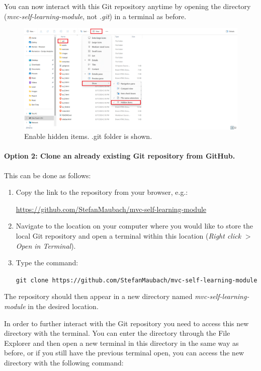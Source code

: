 \documentclass[a4paper,10pt]{article}
\begin{document}
You can now interact with this Git repository anytime by opening the directory (\emph{mvc-self-learning-module}, not \emph{.git}) in a terminal as before.

\begin{figure}[htbp]
    \centering
    \includegraphics[width=\textwidth]{hidden_items.png}
    \caption{Enable hidden items. .git folder is shown.}
    \label{fig:hidden_items}   
\end{figure}

\paragraph{Option 2: Clone an already existing Git repository from GitHub.} This can be done as follows:
\begin{enumerate}
    \item Copy the link to the repository from your browser, e.g.: 

    \url{https://github.com/StefanMaubach/mvc-self-learning-module}
    
    \item Navigate to the location on your computer where you would like to store the local Git repository and open a terminal within this location (\emph{Right click} $>$ \emph{Open in Terminal}).
    
    \item Type the command:

    \texttt{git clone https://github.com/StefanMaubach/mvc-self-learning-module}
\end{enumerate}
The repository should then appear in a new directory named \emph{mvc-self-learning-module} in the desired location. 

In order to further interact with the Git repository you need to access this new directory with the terminal. You can enter the directory through the File Explorer and then open a new terminal in this directory in the same way as before, or if you still have the previous terminal open, you can access the new directory with the following command:
\end{document}
